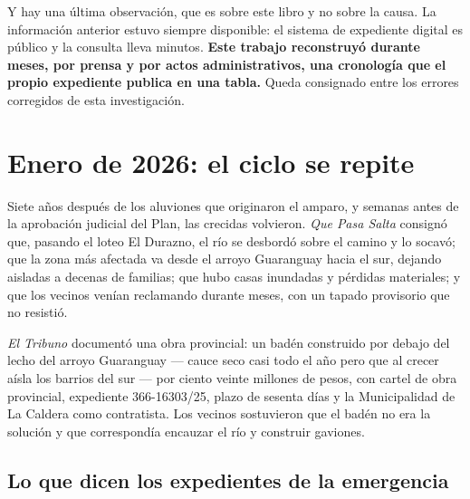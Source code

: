 Y hay una última observación, que es sobre este libro y no sobre la causa. La información
anterior estuvo siempre disponible: el sistema de expediente digital es público y la consulta
lleva minutos. \textbf{Este trabajo reconstruyó durante meses, por prensa y por actos
administrativos, una cronología que el propio expediente publica en una tabla.} Queda
consignado entre los errores corregidos de esta investigación.

\section{Enero de 2026: el ciclo se repite}

Siete años después de los aluviones que originaron el amparo, y semanas antes de la aprobación judicial del Plan, las crecidas volvieron. \textit{Que Pasa Salta} consignó que, pasando el loteo El Durazno, el río se desbordó sobre el camino y lo socavó; que la zona más afectada va desde el arroyo Guaranguay hacia el sur, dejando aisladas a decenas de familias; que hubo casas inundadas y pérdidas materiales; y que los vecinos venían reclamando durante meses, con un tapado provisorio que no resistió.

\textit{El Tribuno} documentó una obra provincial: un badén construido por debajo del lecho del arroyo Guaranguay --- cauce seco casi todo el año pero que al crecer aísla los barrios del sur --- por ciento veinte millones de pesos, con cartel de obra provincial, expediente 366-16303/25, plazo de sesenta días y la Municipalidad de La Caldera como contratista. Los vecinos sostuvieron que el badén no era la solución y que correspondía encauzar el río y construir gaviones.

\subsection*{Lo que dicen los expedientes de la emergencia}

